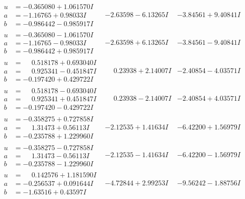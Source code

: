 \documentclass[1p]{elsarticle_modified}
\theoremstyle{definition}
\begin{document}
$$\begin{array}{c|c|c}
\begin{aligned}
u &= -0.365080 + 1.061570 I \\
a &= -1.16765 + 0.98033 I \\
b &= -0.986442 - 0.985917 I\end{aligned}
 & -2.63598 - 6.13265 I & -3.84561 + 9.40841 I \\ \hline\begin{aligned}
u &= -0.365080 - 1.061570 I \\
a &= -1.16765 - 0.98033 I \\
b &= -0.986442 + 0.985917 I\end{aligned}
 & -2.63598 + 6.13265 I & -3.84561 - 9.40841 I \\ \hline\begin{aligned}
u &= \phantom{-}0.518178 + 0.693040 I \\
a &= \phantom{-}0.925341 - 0.451847 I \\
b &= -0.197420 + 0.429722 I\end{aligned}
 & \phantom{-}0.23938 + 2.14007 I & -2.40854 - 4.03571 I \\ \hline\begin{aligned}
u &= \phantom{-}0.518178 - 0.693040 I \\
a &= \phantom{-}0.925341 + 0.451847 I \\
b &= -0.197420 - 0.429722 I\end{aligned}
 & \phantom{-}0.23938 - 2.14007 I & -2.40854 + 4.03571 I \\ \hline\begin{aligned}
u &= -0.358275 + 0.727858 I \\
a &= \phantom{-}1.31473 + 0.56113 I \\
b &= -0.235788 + 1.229960 I\end{aligned}
 & -2.12535 + 1.41634 I & -6.42200 + 1.56979 I \\ \hline\begin{aligned}
u &= -0.358275 - 0.727858 I \\
a &= \phantom{-}1.31473 - 0.56113 I \\
b &= -0.235788 - 1.229960 I\end{aligned}
 & -2.12535 - 1.41634 I & -6.42200 - 1.56979 I \\ \hline\begin{aligned}
u &= \phantom{-}0.142576 + 1.181590 I \\
a &= -0.256537 + 0.091644 I \\
b &= -1.63516 + 0.43597 I\end{aligned}
 & -4.72844 + 2.99253 I & -9.56242 - 1.88756 I \\ \hline\begin{aligned}

\end{aligned}
\end{array}$$
\end{document}
